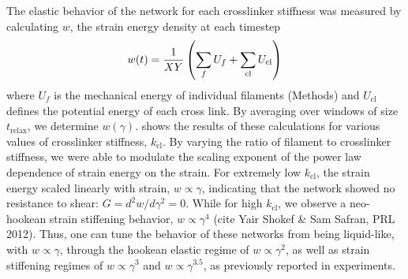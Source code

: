 \documentclass[11pt]{article}
\begin{document}
\par
The {\color{red}elastic behavior of the network} for each crosslinker stiffness was measured by calculating $w$, the strain energy density at each timestep
\begin{equation}
  w(t) = {1\over X Y}\left(\sum_f{ U_f}+\sum_\text{cl}{U_\text{cl}}\right)
  \label{eqn:sed}
\end{equation}
where $U_f$ is {\color{red}the mechanical energy of individual filaments} (Methods) and $U_\text{cl}$ {\color{red}defines} the potential energy of each cross link. {\color{red}By} averaging
over windows of size $t_\text{relax}$, {\color{red}we determine} $w(\gamma)$.  shows the results of these calculations for various values of
crosslinker stiffness, $k_\text{cl}$. By varying the ratio of filament to crosslinker stiffness, we were able to {\color{red}modulate} the scaling {\color{red}exponent of the} power law {\color{red}dependence} of strain energy {\color{red}on} the strain. For extremely low $k_\text{cl}$, {\color{red}the strain energy scaled linearly with strain}, $w\propto \gamma$, {\color{red}indicating that} the network {\color{red}showed} no resistance to shear: $G=d^2w/d\gamma^2=0$. While for high $k_\text{cl}$,
{\color{red}we observe a neo-hookean strain stiffening behavior,} $w\propto\gamma^4$ {\color{blue}(cite Yair Shokef \& Sam Safran, PRL 2012)}. Thus, one can tune the behavior of these networks from being liquid-like, with $w\propto\gamma$, through
the {\color{red}hookean} elastic regime of $w\propto\gamma^2$, as well as strain stiffening regimes of $w\propto\gamma^3$ and
$w\propto\gamma^{3.5}$, {\color{red}as} {\color{red}previously reported} in experiments\cite{gardel2004, kasza2009}. 
\end{document}
